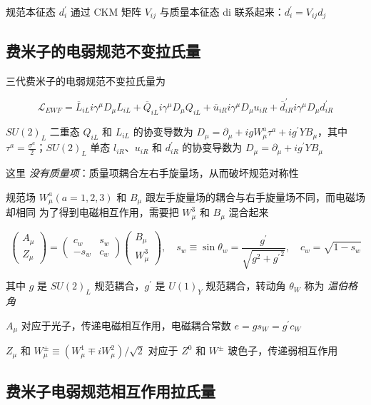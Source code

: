 \documentclass[oneside,a4paper,openany,11pt]{ctexbook}
\begin{document}
规范本征态 $d_i^\prime$ 通过 CKM 矩阵 $V_{ij}$ 与质量本征态 di 联系起来：$d_i^\prime=V_{ij} d_j$

\subsection{费米子的电弱规范不变拉氏量}

三代费米子的电弱规范不变拉氏量为

\begin{equation}
    \mathcal{L}_{EWF} = \overline{L}_{iL} i \gamma^\mu D_\mu L_{iL} + \overline{Q}_{iL} i \gamma^\mu D_\mu Q_{iL} + \overline{u}_{iR} i \gamma^\mu D_\mu u_{iR} + \overline{d}_{iR}^\prime i \gamma^\mu D_\mu d_{iR}^\prime
\end{equation}

$SU(2)_L$ 二重态 $Q_{iL}$ 和 $L_{iL}$ 的协变导数为 $D_\mu=\partial_\mu+ig W_\mu^a \tau^a+ig^\prime Y B_\mu$，其中 $\tau^a=\frac{\sigma^a}{2}$；$SU(2)_L$ 单态 $l_{iR}$、$u_{iR}$ 和 $d_{iR}^\prime$ 的协变导数为 $D_\mu=\partial_\mu+i g^\prime Y B_\mu$

这里 \emph{没有质量项}：质量项耦合左右手旋量场，从而破坏规范对称性

规范场 $W_\mu^a (a=1,2,3)$ 和 $B_\mu$ 跟左手旋量场的耦合与右手旋量场不同，而电磁场却相同 为了得到电磁相互作用，需要把 $W_\mu^3$ 和 $B_\mu$ 混合起来

\begin{equation}
    \begin{pmatrix}A_\mu \\ Z_\mu\end{pmatrix} = \begin{pmatrix}c_w & s_w \\ -s_w & c_w \end{pmatrix} \begin{pmatrix}B_\mu \\ W_\mu^3\end{pmatrix}, \quad s_w \equiv \sin \theta_w = \frac{g^\prime}{\sqrt{g^2+{g^\prime}^2}}, \quad c_w = \sqrt{1 - s_w}
\end{equation}

其中 $g$ 是 $SU(2)_L$ 规范耦合，$g^\prime$ 是 $U(1)_Y$ 规范耦合，转动角 $\theta_W$ 称为 \emph{温伯格角}

$A_\mu$ 对应于光子，传递电磁相互作用，电磁耦合常数 $e=g s_W=g^\prime c_W$

$Z_\mu$ 和 $W_\mu^\pm \equiv (W_\mu^1 \mp i W_\mu^2)/ \sqrt{2}$ 对应于 $Z^0$ 和 $W^\pm$ 玻色子，传递弱相互作用

\subsection{费米子电弱规范相互作用拉氏量}
\end{document}
